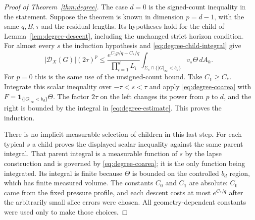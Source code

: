 \begin{proof}[Proof of Theorem~\ref{thm:degree}]
The case $d=0$ is the signed-count inequality in the statement.  Suppose
the theorem is known in dimension $p=d-1$, with the same $q,B,\tau$ and
the residual lengths.  Its hypotheses hold for the child of
Lemma~\ref{lem:degree-descent}, including the unchanged strict horizon
condition.  For almost every $s$ the induction hypothesis and
\eqref{eq:degree-child-integral} give
\[
 |\mathcal D_X(G)|(2\tau)^p
 \le \frac{e^{C_1p/q+C_*/q}}{\prod_{i=1}^dL_i}
          \int_{\Sigma_s\cap\{|G|_\infty<b_d\}}v_s\Theta\,dA_h.
\]
For $p=0$ this is the same use of the unsigned-count bound.  Take
$C_1\ge C_*$.  Integrate this scalar inequality over $-\tau<s<\tau$
and apply \eqref{eq:degree-coarea} with
$F=\mathbf1_{\{|G|_\infty<b_d\}}\Theta$.  The factor $2\tau$ on the
left changes its power from $p$ to $d$, and the right is bounded by
the integral in \eqref{eq:degree-estimate}.  This proves the induction.

There is no implicit measurable selection of children in this last step.
For each typical $s$ a child proves the displayed scalar inequality
against the same parent integral.  That parent integral is a measurable
function of $s$ by the lapse construction and is governed by
\eqref{eq:degree-coarea}; it is the only function being integrated.
Its integral is finite because $\Theta$ is bounded on the controlled
$b_d$ region, which has finite measured volume.
The constants $C_0$ and $C_1$ are absolute: $C_0$ came from the fixed
pressure profile, and each descent costs at most $e^{C_*/q}$ after the
arbitrarily small slice errors were chosen.  All geometry-dependent
constants were used only to make those choices.
\end{proof}
